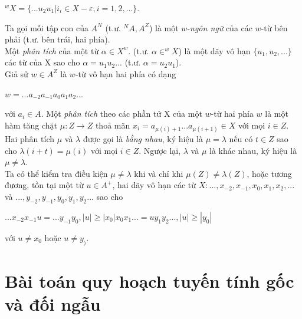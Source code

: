 $^wX = \{ ...u_2u_1 | i_i \in X - \varepsilon , i = 1,2,... \}$.
\begin{flushleft}
\hspace{10mm}Ta gọi mỗi tập con của $A^N$ (t.ư. $^NA, A^Z$) là một $w$-\textit{ngôn ngữ} của các $w$-từ bên phải (t.ư. bên trái, hai phía).\\
\hspace{10mm}Một \textit{phân tích} của một từ $\alpha \in X^w$. (t.ư. $\alpha \in ^wX$) là một dãy vô hạn $\{ u_1, u_2, ... \}$ các từ của X sao cho $\alpha = u_1u_2...$ (t.ư. $\alpha = u_2u_1$).\\
\hspace{10mm}Giả sử $w \in A^Z$ là $w$-từ vô hạn hai phía có dạng
\end{flushleft}
$w = ...a_{-2}a_{-1}a_0a_1a_2$...
\begin{flushleft}
với $a_i \in A$. Một \textit{phân tích} theo các phần tử X của một $w$-từ hai phía $w$ là một hàm tăng chặt $\mu : Z \to Z $ thoả mãn $x_i = a_{\mu(i)+1}$...$a_{\mu(i+1)} \in X$ với mọi $i \in Z$.\\
\hspace{10mm}Hai phân tích $\mu$ và $\lambda$ được gọi là \textit{bằng nhau}, ký hiệu là $\mu = \lambda$ nếu có $t \in Z$ sao cho $\lambda(i+t) = \mu(i)$ với mọi $i \in Z$. Ngược lại, $\lambda$ và $\mu$ là khác nhau, ký hiệu là $\mu \ne \lambda$. \\
Ta có thể kiểm tra điều kiện $\mu \ne \lambda$ khi và chỉ khi $\mu(Z) \ne \lambda(Z)$, hoặc tương đương, tồn tại một từ $u \in A^+$, hai dãy vô hạn các từ $X: ... , x_{-2}, x_{-1}, x_0, x_1, x_2, ...$ và $..., y_{-2}, y_{-1}, y_0, y_1, y_2$... sao cho 
\end{flushleft}
$...x_{-2}x_{-1}u = ...y_{-1}y_0, |u| \ge |x_0|
x_0x_1... = uy_1y_2... , |u| \ge |y_0|
$
\begin{flushleft}
với $u \ne x_0$ hoặc $u \ne y_)$.
\end{flushleft}

\section{Bài toán quy hoạch tuyến tính gốc và đối ngẫu}
